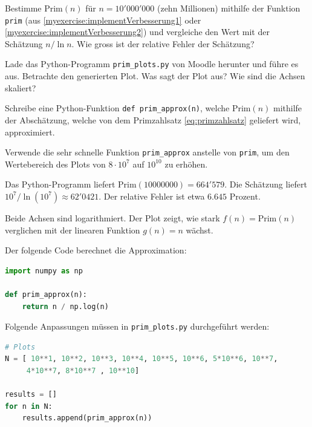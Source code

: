 \begin{myexercise}
	\begin{aenum}
		\item Bestimme $\text{Prim}(n)$ für $n = 10'000'000$ (zehn Millionen) mithilfe der Funktion \lstinline|prim| (aus \cref{myexercise:implementVerbesserung1} oder \cref{myexercise:implementVerbesserung2}) und vergleiche den Wert mit der Schätzung $n/\ln{n}$.
		Wie gross ist der relative Fehler der Schätzung?

		\item Lade das Python-Programm {\tt prim\_plots.py} von Moodle herunter und führe es aus. Betrachte den generierten Plot. Was sagt der Plot aus? Wie sind die Achsen skaliert?

		\item Schreibe eine Python-Funktion \lstinline|def prim_approx(n)|, welche $\text{Prim}(n)$ mithilfe der Abschätzung, welche von dem Primzahlsatz \ref{eq:primzahlsatz} geliefert wird, approximiert.

		\item Verwende die sehr schnelle Funktion \lstinline|prim_approx| anstelle von \lstinline|prim|, um den Wertebereich des Plots von $8\cdot 10^7$ auf $10^{10}$ zu erhöhen.
	\end{aenum}
	\begin{myanswer}
		\begin{aenum}
			\item Das Python-Programm liefert $\text{Prim}(10000000) = 664'579$. Die Schätzung liefert $10^7/\ln{(10^7)}\approx 62'0421$. Der relative Fehler ist etwa $6.645$ Prozent.

			\item Beide Achsen sind logarithmiert. Der Plot zeigt, wie stark $f(n) = \text{Prim}(n)$ verglichen mit der linearen Funktion $g(n) = n$ wächst.

			\item Der folgende Code berechnet die Approximation:

			\begin{lstlisting}[language=Python,numbers=none]
import numpy as np

def prim_approx(n):
    return n / np.log(n)
\end{lstlisting}
			\item
			Folgende Anpassungen müssen in {\tt prim\_plots.py} durchgeführt werden:
			\begin{lstlisting}[language=Python,numbers=none]
# Plots
N = [ 10**1, 10**2, 10**3, 10**4, 10**5, 10**6, 5*10**6, 10**7,
     4*10**7, 8*10**7 , 10**10]

results = []
for n in N:
    results.append(prim_approx(n))
\end{lstlisting}
		\end{aenum}
	\end{myanswer}
\end{myexercise}


